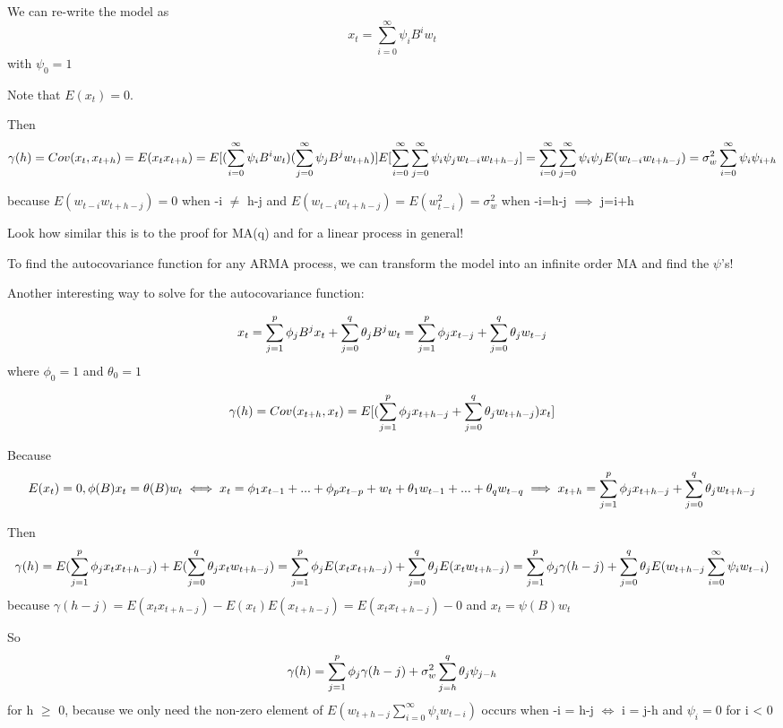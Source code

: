 \documentclass[
]{book}
\theoremstyle{definition}
\theoremstyle{definition}
\theoremstyle{definition}
\theoremstyle{definition}
\theoremstyle{remark}
\begin{document}
We can re-write the model as \[x_t=\sum_{i=0}^{\infty}\psi_iB^iw_t\] with \(\psi_0=1\)

Note that \(E(x_t)=0\).

Then \[\gamma(h)=Cov(x_t,x_{t+h})=E(x_tx_{t+h})\\
=E[(\sum_{i=0}^{\infty}\psi_iB^iw_t)(\sum_{j=0}^{\infty}\psi_jB^jw_{t+h})]\\
E[\sum_{i=0}^{\infty}\sum_{j=0}^{\infty}\psi_i\psi_jw_{t-i}w_{t+h-j}]\\
=\sum_{i=0}^{\infty}\sum_{j=0}^{\infty}\psi_i\psi_jE(w_{t-i}w_{t+h-j})\\
=\sigma_w^2\sum_{i=0}^{\infty}\psi_i\psi_{i+h}\]

because \(E(w_{t-i}w_{t+h-j})=0\) when -i \(\ne\) h-j and \(E(w_{t-i}w_{t+h-j})=E(w_{t-i}^2)=\sigma_w^2\) when -i=h-j \(\implies\) j=i+h

Look how similar this is to the proof for MA(q) and for a linear process in general!

To find the autocovariance function for any ARMA process, we can transform the model into an infinite order MA and find the \(\psi\)'s!

Another interesting way to solve for the autocovariance function:

\[x_t=\sum_{j=1}^{p}\phi_jB^jx_t+\sum_{j=0}^{q}\theta_jB^jw_t\\
=\sum_{j=1}^{p}\phi_jx_{t-j}+\sum_{j=0}^{q}\theta_jw_{t-j}\] where \(\phi_0=1\) and \(\theta_0=1\)

\[\gamma(h)=Cov(x_{t+h},x_t)\\
=E[(\sum_{j=1}^{p}\phi_jx_{t+h-j}+\sum_{j=0}^{q}\theta_jw_{t+h-j})x_t]\]

Because \[E(x_t)=0, \phi(B)x_t=\theta(B)w_t\iff x_t=\phi_1x_{t-1}+...+\phi_px_{t-p}+w_t+\theta_1w_{t-1}+...+\theta_qw_{t-q}\\
\implies x_{t+h}=\sum_{j=1}^{p}\phi_jx_{t+h-j}+\sum_{j=0}^{q}\theta_jw_{t+h-j}\]

Then \[\gamma(h)\\
=E(\sum_{j=1}^{p}\phi_jx_tx_{t+h-j})+E(\sum_{j=0}^{q}\theta_jx_tw_{t+h-j})\\
=\sum_{j=1}^{p}\phi_jE(x_tx_{t+h-j})+\sum_{j=0}^{q}\theta_jE(x_tw_{t+h-j})\\
=\sum_{j=1}^{p}\phi_j\gamma(h-j)+\sum_{j=0}^{q}\theta_jE(w_{t+h-j}\sum_{i=0}^{\infty}\psi_iw_{t-i})\] because \(\gamma(h-j)=E(x_tx_{t+h-j})-E(x_t)E(x_{t+h-j})=E(x_tx_{t+h-j})-0\) and \(x_t=\psi(B)w_t\)

So \[\gamma(h)\\
=\sum_{j=1}^{p}\phi_j\gamma(h-j)+\sigma_w^2\sum_{j=h}^{q}\theta_j\psi_{j-h}\] for h \(\ge\) 0, because we only need the non-zero element of \(E(w_{t+h-j}\sum_{i=0}^{\infty}\psi_iw_{t-i})\) occurs when -i = h-j \(\iff\) i = j-h and \(\psi_i = 0\) for i \textless{} 0
\end{document}
